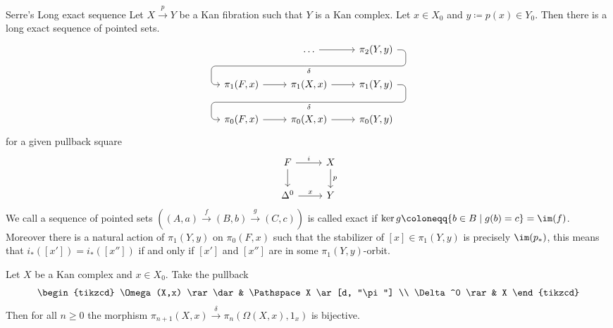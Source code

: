 \begin{thm}{Serre's Long exact sequence}
    Let $X \xrightarrow{p} Y$ be a Kan fibration such that $Y$ is a Kan complex. Let $x \in X_0$ and $y\coloneqq p(x) \in Y_0$. Then there is a long exact sequence of pointed sets.
    \[
    \begin{tikzcd}
        & 
        \dotsc
        \rar
        \arrow[d, phantom, ""{coordinate, name=Z1}]
        &
        \pi_2(Y,y)
        \arrow[ dll,
                        "\delta", pos=1,
                        rounded corners,
                        to path={ -- ([xshift=2ex]\tikztostart.east)
                                  |- (Z1) \tikztonodes
                                  -| ([xshift=-2ex]\tikztotarget.west)
                                  -- (\tikztotarget)}
                      ]
        \\
        \pi_1(F,x)
        \rar
        & 
        \pi_1(X,x)
        \rar
        \arrow[d, phantom, ""{coordinate, name=Z}]
        &
        \pi_1(Y,y)
        \arrow[ dll,
                        "\delta", pos=1,
                        rounded corners,
                        to path={ -- ([xshift=2ex]\tikztostart.east)
                                  |- (Z) \tikztonodes
                                  -| ([xshift=-2ex]\tikztotarget.west)
                                  -- (\tikztotarget)}
                      ]
        \\
        \pi_0(F,x)
        \rar
        &
        \pi_0(X,x)
        \rar
        &
        \pi_0(Y,y)
    \end{tikzcd}
    \]
    for a given pullback square
    \[
    \begin{tikzcd}
        F
        \ar[r, "i"]
        \ar[d]
        &
        X
        \ar[d, "p"]
        \\
        \Delta^0
        \ar[r,"x"]
        &
        Y
    \end{tikzcd}
    \]
    We call a sequence of pointed sets $((A,a) \xrightarrow{f} (B,b) \xrightarrow{g} (C,c))$ is called exact if $\ker g \coloneqq \{b \in B \mid g(b) = c\} = \im (f)$. 
    Moreover there is a natural action of $\pi_1(Y,y)$ on $\pi_0(F,x)$ such that the stabilizer of $[x] \in \pi_1(Y,y)$ is precisely $\im(p_*)$, this means that $i_*([x'])=i_*([x''])$ if and only if $[x']$ and $[x'']$ are in some $\pi_1(Y,y)$-orbit.
\end{thm}

\begin{cor}
    Let $X$ be a Kan complex and $x \in X_0$. Take the pullback 
    \[
    \begin{tikzcd}
        \Omega(X,x)
        \rar
        \dar
        &
        \Pathspace X
        \ar[d, "\pi"]
        \\
        \Delta^0
        \rar
        &
        X
    \end{tikzcd}
    \]
    Then for all $n \geq 0$ the morphism $\pi_{n+1}(X,x) \xrightarrow{\delta} \pi_n(\Omega(X,x),1_x)$ is bijective.
\end{cor}

